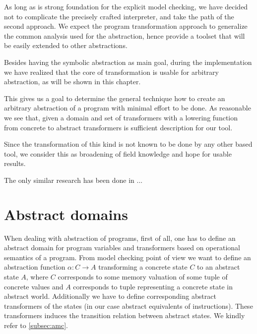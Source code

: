 

As long as \DIVINE is strong foundation for the explicit model checking, we have
decided not to complicate the precisely crafted interpreter, and take the path of
the second approach. We expect the program transformation approach to generalize
the common analysis used for the abstraction, hence provide a toolset that will be
easily extended to other abstractions.

Besides having the symbolic abstraction as main goal, during the implementation
we have realized that the core of transformation is usable for arbitrary
abstraction, as will be shown in this chapter.

This gives us a goal to determine the general technique how to create an arbitrary
abstraction of a program with minimal effort to be done. As reasonable we see
that, given a domain and set of transformers with a lowering function from
concrete to abstract transformers is sufficient description for our tool.

Since the transformation of this kind is not known to be done by any other
\LLVM based tool, we consider this as broadening of field knowledge and hope for
usable results.

The only similar research has been done in ... 

\section{Abstract domains} \label{sec:absdom}

When dealing with abstraction of programs, first of all, one has to define an
abstract domain for program variables and transformers based on operational
semantics of a program. From model checking point of view we want to define an
abstraction function $\alpha \colon C \to A$ transforming a concrete
state $C$ to an abstract state $A$, where $C$ corresponds to some memory
valuation of some tuple of concrete values and $A$ corresponds to tuple
representing a concrete state in abstract world.  Additionally we have to define
corresponding abstract transformers of the states (in our
case abstract equivalents of \LLVM instructions). These transformers induces
the transition relation between abstract states. We kindly refer to
\autoref{subsec:amc}.

